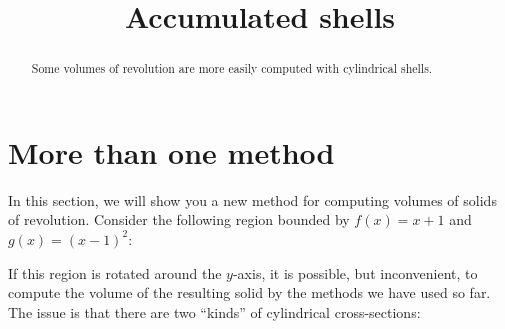 \documentclass{ximera}
\title[Dig-In:]{Accumulated shells}
\begin{document}
\begin{abstract}
Some volumes of revolution are more easily computed with cylindrical shells. 
\end{abstract}
\maketitle


\section{More than one method}

In this section, we will show you a new method for computing volumes
of solids of revolution.  Consider the following region bounded by
$f(x)=x+1$ and $g(x)=(x-1)^2$:
\begin{image}
\end{image}
If this region is rotated around the $y$-axis, it is possible, but
inconvenient, to compute the volume of the resulting solid by the
methods we have used so far. The issue is that there are two
``kinds'' of cylindrical cross-sections: 
\end{document}
